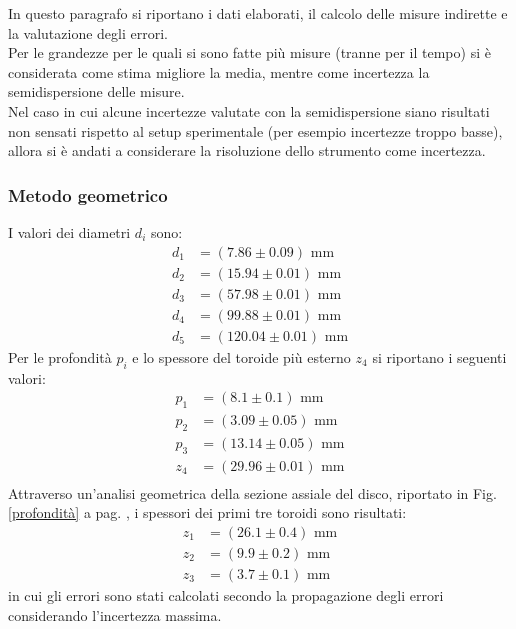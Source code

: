 In questo paragrafo si riportano i dati elaborati, il calcolo delle misure indirette e la valutazione degli errori.\\
Per le grandezze per le quali si sono fatte più misure (tranne per il tempo) si è considerata come stima migliore la media, mentre come incertezza la semidispersione delle misure.\\
Nel caso in cui alcune incertezze valutate con la semidispersione siano risultati non sensati rispetto al setup sperimentale (per esempio incertezze troppo basse), allora si è andati a considerare la risoluzione dello strumento come incertezza.

\subsubsection*{Metodo geometrico}
I valori dei diametri $d_i$ sono:
    \begin{align*}
        d_1 &= (7.86 \pm 0.09) \textrm{ mm} \\
        d_2 &= (15.94 \pm 0.01) \textrm{ mm} \\
        d_3 &= (57.98 \pm 0.01) \textrm{ mm} \\
        d_4 &= (99.88 \pm 0.01) \textrm{ mm} \\
        d_5 &= (120.04 \pm 0.01) \textrm{ mm} 
    \end{align*}
Per le profondità $p_i$ e lo spessore del toroide più esterno $z_4$ si riportano i seguenti valori:
    \begin{align*}
        p_1 &= (8.1 \pm 0.1) \textrm{ mm} \\
        p_2 &= (3.09 \pm 0.05) \textrm{ mm} \\
        p_3 &= (13.14 \pm 0.05) \textrm{ mm} \\
        z_4 &= (29.96 \pm 0.01) \textrm{ mm} \\
    \end{align*}
Attraverso un'analisi geometrica della sezione assiale del disco, riportato in Fig. \ref{profondità} a pag. \pageref{profondità}, i spessori dei primi tre toroidi sono risultati:
    \begin{align*}
        z_1 &= (26.1 \pm 0.4) \textrm{ mm} \\
        z_2 &= (9.9 \pm 0.2) \textrm{ mm} \\
        z_3 &= (3.7 \pm 0.1) \textrm{ mm}
    \end{align*}
in cui gli errori sono stati calcolati secondo la propagazione degli errori considerando l'incertezza massima.\\


